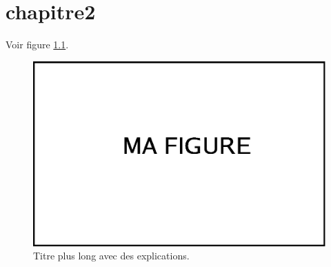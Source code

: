 \chapter{chapitre2}


Voir figure \ref{fig:mafigure2}.


\begin{figure}[htbp]
   \begin{center}
      \includegraphics[width=0.8\linewidth]{chapitre2/fig/mafigure.eps}
   \end{center}
   \caption[titre court pour la liste des figures]
   {\footnotesize Titre plus long avec des explications.}
   \label{fig:mafigure2}
\end{figure}
